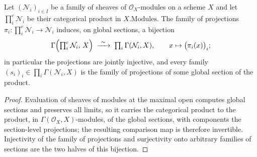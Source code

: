 \begin{lemma}
  \label{lem:gamma_pi_sections}
  \leanok
  Let \((\mathcal N_i)_{i \in I}\) be a family of sheaves of
  \(\mathcal O_X\)-modules on a scheme \(X\) and let
  \(\textstyle\prod^{c}_i \mathcal N_i\) be their categorical product in
  \(X.\mathrm{Modules}\). The family of projections
  \(\pi_i : \prod^{c}_i \mathcal N_i \to \mathcal N_i\) induces, on global
  sections, a bijection
  \[
    \Gamma\Bigl(\textstyle\prod^{c}_i \mathcal N_i,\, X\Bigr)
      \;\xrightarrow{\ \sim\ }\; \prod_i \Gamma(\mathcal N_i, X), \qquad
    x \mapsto \bigl(\pi_i(x)\bigr)_i;
  \]
  in particular the projections are jointly injective, and every family
  \((s_i)_i \in \prod_i \Gamma(\mathcal N_i, X)\) is the family of
  projections of some global section of the product.
\end{lemma}
\begin{proof}\leanok
  Evaluation of sheaves of modules at the maximal open computes global
  sections and preserves all limits, so it carries the categorical product
  to the product, in \(\Gamma(\mathcal O_X, X)\)-modules, of the global
  sections, with components the section-level projections; the resulting
  comparison map is therefore invertible. Injectivity of the family of
  projections and surjectivity onto arbitrary families of sections are the
  two halves of this bijection.
\end{proof}

